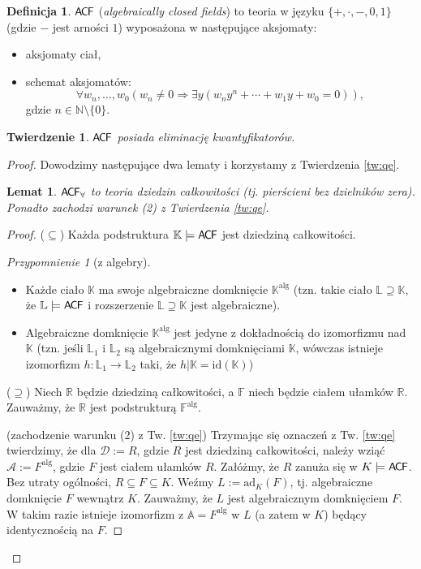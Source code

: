 \documentclass{article}
\newcommand{\N}{\mathbb{N}}
\newcommand{\A}{\mathbb{A}}
\newcommand{\id}{\text{id}}
\theoremstyle{plain}
\newtheorem{tw}[thm]{Twierdzenie}
\newtheorem{lem}[thm]{Lemat}
\theoremstyle{definition}
\newtheorem{df}[thm]{Definicja}
\theoremstyle{remark}
\newtheorem{przyp}[thm]{Przypomnienie}
\newcommand{\ACF}{\mathsf{A \mkern-2.0mu C \mkern-1.1mu F}}
\begin{document}
\begin{df}
	$\ACF$ (\textit{algebraically closed fields}) to teoria w języku $\{+,
	\cdot, -, 0, 1\}$ (gdzie $-$ jest arności $1$) wyposażona w następujące
	aksjomaty:
	\begin{itemize}
		\item aksjomaty ciał,
		\item schemat aksjomatów:
		$$\forall w_n, \ldots, w_0
			(w_n \neq 0 \Rightarrow
			\exists y (w_n y^n + \cdots + w_1y + w_0 = 0)),$$
			gdzie $n \in \N \setminus \{0\}$.
	\end{itemize}
\end{df}

\begin{tw}
	$\ACF$ posiada eliminację kwantyfikatorów.
\end{tw}
\begin{proof}
Dowodzimy następujące dwa lematy i korzystamy z Twierdzenia \ref{tw:qe}.

\begin{lem}
	$\ACF_{\forall}$ to teoria dziedzin całkowitości (tj. pierścieni bez
	dzielników zera). Ponadto zachodzi warunek (2) z Twierdzenia \ref{tw:qe}.
\end{lem}
\begin{proof}
	($\subseteq$) Każda podstruktura $\mathbb{K} \models \ACF$ jest dziedziną
	całkowitości.
\begin{przyp}[z algebry]
	~\begin{itemize}
		\item Każde ciało $\mathbb{K}$ ma swoje algebraiczne domknięcie
			$\mathbb{K}^{\text{alg}}$ (tzn. takie ciało $\mathbb{L}
			\supseteq \mathbb{K}$, że $\mathbb{L} \models \ACF$ i
			rozszerzenie $\mathbb{L} \supseteq \mathbb{K}$ jest
			algebraiczne).
		\item Algebraiczne domknięcie $\mathbb{K}^{\text{alg}}$ jest
			jedyne z dokładnością do izomorfizmu nad $\mathbb{K}$
			(tzn. jeśli $\mathbb{L}_1$ i $\mathbb{L}_2$ są
			algebraicznymi domknięciami $\mathbb{K}$, wówczas
			istnieje izomorfizm $h \colon \mathbb{L}_1
			\rightarrow \mathbb{L}_2$ taki, że $h|\mathbb{K} =
			\id(\mathbb{K})$)
	\end{itemize}
\end{przyp}
	($\supseteq$)
	Niech $\mathbb{R}$ będzie dziedziną całkowitości, a $\mathbb{F}$ niech
	będzie ciałem ułamków $\mathbb{R}$. Zauważmy, że $\mathbb{R}$ jest
	podstrukturą $\mathbb{F}^\text{alg}$.

	(zachodzenie warunku (2) z Tw. \ref{tw:qe})
	Trzymając się oznaczeń z Tw. \ref{tw:qe} twierdzimy, że dla
	$\mathcal{D} := R$, gdzie $R$ jest dziedziną całkowitości, należy wziąć
	$\mathcal{A} := F^\text{alg}$, gdzie $F$ jest ciałem ułamków $R$.
	Załóżmy, że $R$ zanuża się w $K \models \ACF$. Bez utraty ogólności,
	$R \subseteq F \subseteq K$. Weźmy $L := \text{ad}_K(F)$, %
	tj. algebraiczne domknięcie $F$ wewnątrz $K$. Zauważmy, że $L$ jest
	algebraicznym domknięciem $F$. W takim razie istnieje izomorfizm
	z $\A = F^\text{alg}$ w $L$ (a zatem w $K$) będący identycznością na $F$.
\end{proof}


\end{proof}
\end{document}
